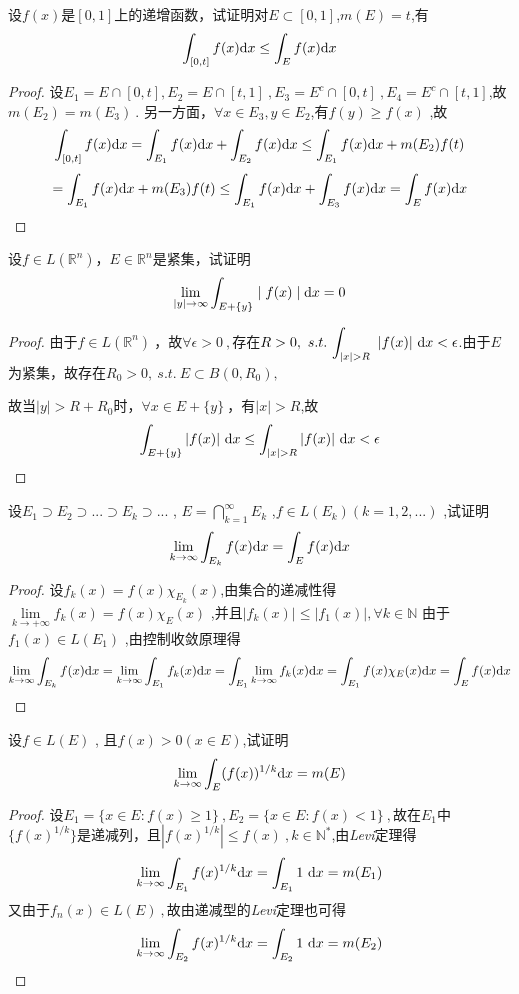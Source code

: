 设$f(x)$是$[0,1]$上的递增函数，试证明对$E \subset [0,1]$,$m(E)=t$,有$$\int_{[0,t]} f(x) \mathrm{d}x \leq \int_E f(x) \mathrm{d}x$$
\begin{proof}
设$E_1=E\cap[0,t], E_2=E\cap[t,1]\ ,E_3=E^c\cap[0,t]\ ,E_4=E^c\cap[t,1]$,故$m(E_2)=m(E_3)\ $.
另一方面，$\forall x\in E_3,y\in E_2$,有$f(y)\geq f(x)$
,故$$\int_{[0,t]}f(x)\mathrm{d}x=\int_{E_1}f(x)\mathrm{d}x+\int_{E_2}f(x)\mathrm{d}x\leq\int_{E_1}f(x)\mathrm{d}x+m(E_2)f(t)$$$$=\int_{E_1}f(x)\mathrm{d}x+m(E_3)f(t)\leq \int_{E_1}f(x)\mathrm{d}x+\int_{E_3}f(x)\mathrm{d}x=\int_{E}f(x)\mathrm{d}x$$
\end{proof}


设$f\in L(\mathbb{R}^n)$，$E\in \mathbb{R}^n$是紧集，试证明$$\lim\limits_{\mid y \mid \to \infty} \int_{E+\{y\}} \mid f(x) \mid \mathrm{d}x=0$$
\begin{proof}
由于$f\in L(\mathbb{R}^n) \ $，故$\forall \epsilon>0\ ,$存在$R>0,\ s.t.\ \displaystyle{\int_{|x|>R}\ |f(x)|\ \di{x}<\epsilon}$.由于$E$为紧集，故存在$R_0>0,\ s.t. \ E\subset B(0,R_0),$\par 故当$|y|>R+R_0$时，$\forall x\in E+\{y\}\ $，有$|x|>R$,故$$\int_{E+\{y\}}|f(x)|
\ \di{x\leq\int_{|x|>R}}|f(x)|\ \di{x<\epsilon}$$
\end{proof}


设$E_1 \supset E_2 \supset...\supset E_k \supset... $ , $ E=\bigcap\limits_{k=1}^{\infty}{E_k} $ ,$ f\in L(E_k)(k=1,2,...) $ ,试证明$$\lim\limits_{k \to \infty}\int_{E_k} f(x) \mathrm{d}x=\int_E f(x) \mathrm{d}x$$
\begin{proof}
设$f_k(x)=f(x)\chi_{E_k}(x)$,由集合的递减性得$\lim\limits_{k \to +\infty}f_k(x)=f(x)\chi_E(x) $ ,并且$\mid f_k(x)\mid \leq  \mid f_1(x)\mid ,\forall k \in \mathbb{N}$ 由于$f_1(x)\in L(E_1) $ ,由控制收敛原理得$$\lim\limits_{k \to \infty} \int_{E_k} f(x) \mathrm{d}x=\lim\limits_{k \to \infty} \int_{E_1} f_k(x) \mathrm{d}x= \int_{E_1} \lim\limits_{k \to \infty}f_k(x) \mathrm{d}x=\int_{E_1} f(x)\chi_E(x) \mathrm{d}x=\int_{E} f(x) \mathrm{d}x $$
\end{proof}


设$f\in L(E)$ , 且$f(x)>0(x \in E)$,试证明$$\lim\limits_{k \to \infty}\int_{E} (f(x))^{1/k} \mathrm{d}x=m(E)$$
\begin{proof}
设$E_1=\{x\in E:f(x)\geq1\}\ ,E_2=\{x\in E:f(x)<1\}\ ,$故在$E_1$中$\{f(x)^{1/k}\}$是递减列，且$|f(x)^{1/k}|\leq f(x)\ ,k \in \mathbb{N}^*$,由\emph{Levi}定理得$$\lim\limits_{k\to\infty}\int_{E_1}f(x)^{1/k}\mathrm{d}x= \int_{E_1}1\ \mathrm{d}x=m(E_1)$$
又由于$f_n(x)\in L(E)\ ,$故由递减型的\emph{Levi}定理也可得$$\lim\limits_{k\to\infty}\int_{E_2}f(x)^{1/k}\mathrm{d}x= \int_{E_2}1\ \mathrm{d}x=m(E_2)$$
\end{proof}

